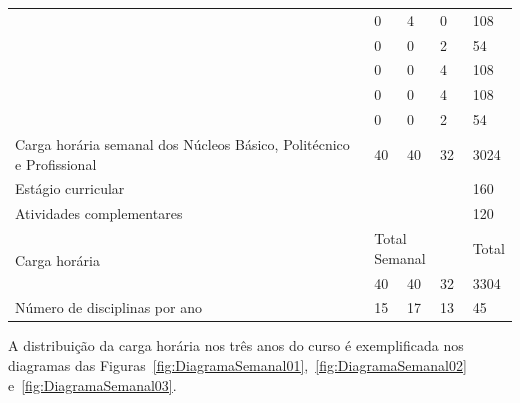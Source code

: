 \documentclass[11pt,fleqn]{book} %
\begin{document}
\begin{table}[H]
{\begin{tabular}{|l|l|l|l|l|l|}
			& \nameref{disc:analitica}                                                     & 0          & 4         & 0         & 108       \\ \cline{2-6}
			& \nameref{disc:biotecSaude}                                                   & 0          & 0         & 2         & 54        \\ \cline{2-6} 
			& \nameref{disc:microbiologia}                                                 & 0          & 0         & 4         & 108       \\ \cline{2-6}
			& \nameref{disc:producao}                                                      & 0          & 0         & 4         & 108       \\ \cline{2-6} 
			& \nameref{disc:fermentacao}                                                   & 0          & 0         & 2         & 54        \\ \hline			
			\multicolumn{2}{|l|}{Carga horária semanal dos Núcleos Básico, Politécnico e Profissional} %
			                                                                               & 40         & 40        & 32        & 3024      \\ \hline
			\multicolumn{5}{|l|}{Estágio curricular}                                                                            & 160       \\ \hline
			\multicolumn{5}{|l|}{Atividades complementares}                                                                     & 120       \\ \hline
			\multicolumn{2}{|l|}{\multirow{2}{*}{Carga horária}}                           & \multicolumn{3}{l|}{Total Semanal} & Total     \\ \cline{3-6} 
			\multicolumn{2}{|l|}{}                                                         & 40         & 40        & 32        & 3304      \\ \hline
			\multicolumn{2}{|l|}{Número de disciplinas por ano}                            & 15         & 17        & 13        & 45        \\ \hline
		\end{tabular}%
	}
\end{table}

A distribuição da carga horária nos três anos do curso é exemplificada nos diagramas das Figuras~\ref{fig:DiagramaSemanal01},~\ref{fig:DiagramaSemanal02} e~\ref{fig:DiagramaSemanal03}.
\end{document}
